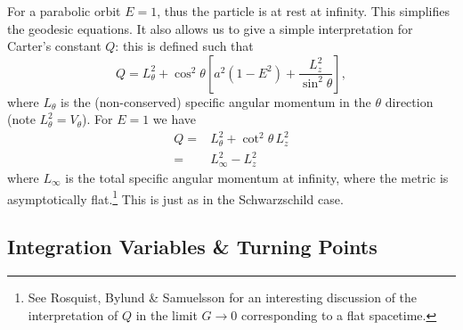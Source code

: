 \documentclass[a4paper, 11pt, titlepage, twoside]{report}
\begin{document}
For a parabolic orbit $E = 1$, thus the particle is at rest at infinity. This simplifies the geodesic equations. It also allows us to give a simple interpretation for Carter's constant $Q$: this is defined such that
\begin{equation}
Q = L_\theta^2 + \cos^2\theta\left[a^2\left(1 - E^2\right) + \frac{L_z^2}{\sin^2\theta}\right],
\end{equation}
where $L_\theta$ is the (non-conserved) specific angular momentum in the $\theta$ direction (note $L_\theta^2 = V_\theta$). For $E = 1$ we have
\begin{align}
Q = {} & L_\theta^2 + \cot^2\theta\, L_z^2 \nonumber \\
 = {} & L_\infty^2 - L_z^2
\end{align}
where $L_\infty$ is the total specific angular momentum at infinity, where the metric is asymptotically flat\cite{DeFelice1980}.\footnote{See Rosquist, Bylund \& Samuelsson\cite{Rosquist2009} for an interesting discussion of the interpretation of $Q$ in the limit $G \rightarrow 0$ corresponding to a flat spacetime.} This is just as in the Schwarzschild case.

\subsection{Integration Variables \& Turning Points}
\end{document}

